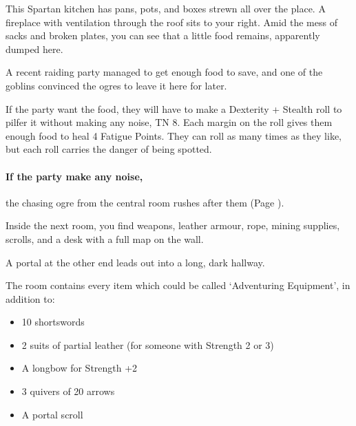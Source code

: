 \begin{multicols}{2}

\begin{boxtext}

	This Spartan kitchen has pans, pots, and boxes strewn all over the place.
	A fireplace with ventilation through the roof sits to your right.
	Amid the mess of sacks and broken plates, you can see that a little food remains, apparently dumped here.

\end{boxtext}

A recent raiding party managed to get enough food to save, and one of the goblins convinced the ogres to leave it here for later.

If the party want the food, they will have to make a Dexterity + Stealth roll to pilfer it without making any noise, TN 8.
Each margin on the roll gives them enough food to heal 4 Fatigue Points.
They can roll as many times as they like, but each roll carries the danger of being spotted.

\paragraph{If the party make any noise,}
the chasing ogre from the central room rushes after them (Page \pageref{chasingogre}).


\begin{boxtext}

	Inside the next room, you find weapons, leather armour, rope, mining supplies, scrolls, and a desk with a full map on the wall.

	A portal at the other end leads out into a long, dark hallway.

\end{boxtext}

The room contains every item which could be called `Adventuring Equipment',
\iftoggle{core}{%
\footnote{See the core book, page \pageref{start_equipment}.}
}{}%
in addition to:

\begin{itemize}

	\item{10 shortswords}
	\item{2 suits of partial leather (for someone with Strength 2 or 3)}
	\iftoggle{hardcore}{%
	\item{1 suit of partial leather (for someone with Strength 1 or 2)}
	}{
	\item{2 suits of partial chain (for someone with Strength 1 or 2)}
	}
	\item{A longbow for Strength +2}
	\item{3 quivers of 20 arrows}
	\item{A portal scroll}


\end{itemize}
\end{multicols}
